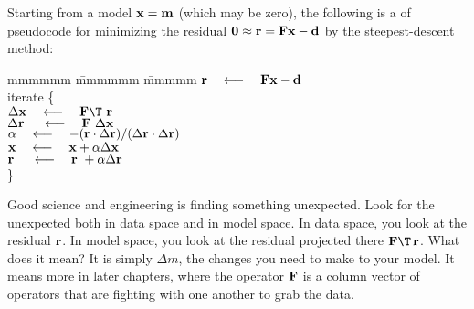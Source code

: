 \par
Starting from a model $\bold x = \bold m$ (which may be zero),
the following is a  of pseudocode for minimizing the residual
$\bold 0\approx \bold r = \bold F \bold x - \bold d$
by the steepest-descent method:
\label{lsq/'sdtemplate'}
\begin{tabbing}
mmmmmm \= mmmmmm \= mmmmm \kill
\> $\bold r \quad\longleftarrow\quad \bold F \bold x - \bold d$ \\
\> {\rm iterate \{ }                                                    \\
\>      \>  $\Delta \bold x   \padarrow \bold F\T\         \bold r$      \\
\>      \>  $\Delta \bold r\  \quad\longleftarrow\quad \bold F \  \Delta \bold x$      \\
\>      \> $\alpha \quad\longleftarrow\quad
                -(       \bold r \cdot \Delta\bold r )/
                 (\Delta \bold r \cdot \Delta\bold r )
                $
                \\
\>      \> $\bold x   \quad\longleftarrow\quad \bold x   + \alpha\Delta \bold x$       \\
\>      \> $\bold r\  \quad\longleftarrow\quad \bold r\  + \alpha\Delta \bold r$       \\
\>      \> \}                                                   
\end{tabbing}


\par
Good science and engineering is finding something unexpected.
Look for the unexpected both in data space and in model space.
In data space, you look at the residual $\bold r$.
In model space, you look at the residual projected there $\bold F\T\,\bold r$.
What does it mean?
It is simply $\Delta m$,
the changes you need to make to your model.
It means more in later chapters,
where the operator $\bold F$ is a column vector of operators
that are fighting with one another to grab the data.



